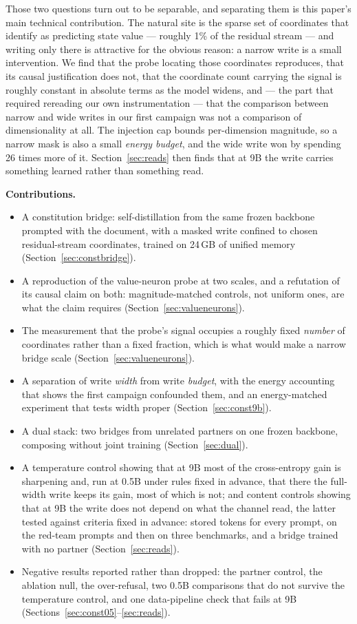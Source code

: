 \documentclass[11pt]{article}
\begin{document}
Those two questions turn out to be separable, and separating them is this paper's main technical contribution. The natural site is the sparse set of coordinates that \citet{xu2026valueneurons} identify as predicting state value --- roughly 1\% of the residual stream --- and writing only there is attractive for the obvious reason: a narrow write is a small intervention. We find that the probe locating those coordinates reproduces, that its causal justification does not, that the coordinate count carrying the signal is roughly constant in absolute terms as the model widens, and --- the part that required rereading our own instrumentation --- that the comparison between narrow and wide writes in our first campaign was not a comparison of dimensionality at all. The injection cap bounds per-dimension magnitude, so a narrow mask is also a small \emph{energy budget}, and the wide write won by spending 26 times more of it. Section~\ref{sec:reads} then finds that at 9B the write carries something learned rather than something read.

\textbf{Contributions.}
\begin{itemize}
\item A constitution bridge: self-distillation from the same frozen backbone prompted with the document, with a masked write confined to chosen residual-stream coordinates, trained on 24\,GB of unified memory (Section~\ref{sec:constbridge}).
\item A reproduction of the value-neuron probe at two scales, and a refutation of its causal claim on both: magnitude-matched controls, not uniform ones, are what the claim requires (Section~\ref{sec:valueneurons}).
\item The measurement that the probe's signal occupies a roughly fixed \emph{number} of coordinates rather than a fixed fraction, which is what would make a narrow bridge scale (Section~\ref{sec:valueneurons}).
\item A separation of write \emph{width} from write \emph{budget}, with the energy accounting that shows the first campaign confounded them, and an energy-matched experiment that tests width proper (Section~\ref{sec:const9b}).
\item A dual stack: two bridges from unrelated partners on one frozen backbone, composing without joint training (Section~\ref{sec:dual}).
\item A temperature control showing that at 9B most of the cross-entropy gain is sharpening and, run at 0.5B under rules fixed in advance, that there the full-width write keeps its gain, most of which is not; and content controls showing that at 9B the write does not depend on what the channel read, the latter tested against criteria fixed in advance: stored tokens for every prompt, on the red-team prompts and then on three benchmarks, and a bridge trained with no partner (Section~\ref{sec:reads}).
\item Negative results reported rather than dropped: the partner control, the ablation null, the over-refusal, two 0.5B comparisons that do not survive the temperature control, and one data-pipeline check that fails at 9B (Sections~\ref{sec:const05}--\ref{sec:reads}).
\end{itemize}
\end{document}
